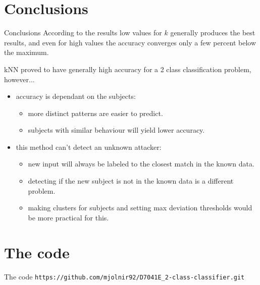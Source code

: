 \documentclass{beamer}
\begin{document}
\section{Conclusions}
\begin{frame}{Conclusions}
	According to the results low values for $k$ generally produces the best results, and even for high values the accuracy converges only a few percent below the maximum.

	kNN proved to have generally high accuracy for a 2 class classification problem, however...
	\begin{itemize}
		\item accuracy is dependant on the subjects:
		\begin{itemize}
			\item more distinct patterns are easier to predict.
			\item subjects with similar behaviour will yield lower accuracy.
		\end{itemize}
		\item this method can't detect an unknown attacker:	
		\begin{itemize}
			\item new input will always be labeled to the closest match in the known data.
			\item detecting if the new subject is not in the known data is a different problem.
			\item making clusters for subjects and setting max deviation thresholds would be more practical for this.
		\end{itemize}
	\end{itemize}
\end{frame}

\section{The code}
\begin{frame}{The code}
	\texttt{https://github.com/mjolnir92/D7041E\_2-class-classifier.git}
\end{frame}
\end{document}
